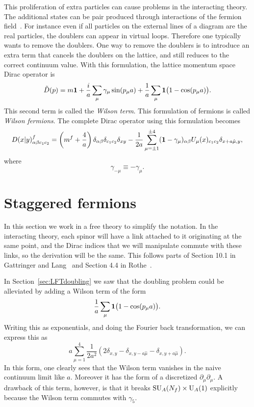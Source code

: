 This proliferation of extra particles can cause problems in the
interacting theory. The additional states can be pair produced
through interactions of the fermion field~\cite{montvay_quantum_1994}.
For instance even if all particles on the external lines of a diagram
are the real particles, the doublers can appear in virtual loops.
Therefore one typically wants to remove the doublers.
One way to remove the doublers is to introduce an extra term that
cancels the doublers on the lattice, and still reduces to the
correct continuum value. With this formulation, the lattice
momentum space Dirac operator is
\begin{equation}
  \tilde{D}(p)=m{\mathbf 1}+\frac{i}{a}\sum_\mu\gamma_\mu\sin(p_\mu a)
                   +\frac{1}{a}\sum_\mu{\mathbf 1}\big(1-\cos(p_\mu a)\big).
\end{equation} 
This second term is called the {\it Wilson term}. This formulation
of fermions is called {\it Wilson fermions}. The complete Dirac
operator using this formulation becomes 
\begin{equation}
  D(x|y)^f_{\alpha\beta c_1c_2}
  =\left(m^f+\frac{4}{a}\right)\delta_{\alpha\beta}
                               \delta_{c_1c_2}
                               \delta_{xy}
   -\frac{1}{2a}\sum_{\mu=\pm 1}^{\pm 4}({\mathbf 1}-\gamma_\mu)_{\alpha\beta}
      U_\mu(x)_{c_1 c_2}\delta_{x+a\hat{\mu},y},
\end{equation}
where
\begin{equation}
  \gamma_{-\mu}\equiv-\gamma_{\mu}.
\end{equation}

\section{Staggered fermions}

In this section we work in a free theory to simplify the notation.
In the interacting theory, each spinor will have a link attached to it
originating at the same point, and the Dirac indices that we will
manipulate commute with these links, so the derivation will be the same.
This follows parts of Section 10.1 in Gattringer and
Lang~\cite{gattringer_quantum_2010} and Section 4.4 in
Rothe~\cite{rothe_lattice_2005}.

In Section~\ref{sec:LFTdoubling} we saw that the doubling problem could
be alleviated by adding a Wilson term of the form
\begin{equation}
  \frac{1}{a}\sum_\mu{\mathbf 1}\big(1-\cos(p_\mu a)\big).
\end{equation}
Writing this as exponentials, and doing the Fourier back transformation,
we can express this as
\begin{equation}
  a\sum_{\mu=1}^4\frac{1}{2a^2}
\left(2\delta_{x,y}-\delta_{x,y-a\hat{\mu}}-\delta_{x,y+a\hat{\mu}}\right).
\end{equation}
In this form, one clearly sees that the Wilson term vanishes in the
naive continuum limit like $a$. Moreover it has the form of a
discretized $\partial_\mu\partial_\mu$. A drawback of this term,
however, is that it breaks $\operatorname{SU}_A(N_f)\times\operatorname{U}_A(1)$ explicitly
because the Wilson term commutes with $\gamma_5$.


